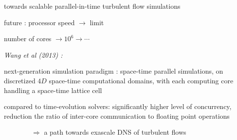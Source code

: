 \begin{frame}{
towards scalable parallel-in-time turbulent flow simulations
}
\begin{block}{future :}%
processor speed $\to$ limit

\medskip

number of cores $\to 10^6 \to \cdots$

\medskip
\end{block}

\emph{Wang et al (2013)
    :} %

next-generation simulation paradigm : space-time parallel
simulations, on discretized $4D$ space-time
computational domains, with each computing core handling a space-time lattice cell

\bigskip

compared to time-evolution solvers:
significantly higher level of concurrency, reduction the ratio of
inter-core communication to floating point operations

\bigskip

$\qquad\qquad\Rightarrow$ a path towards exascale DNS of turbulent flows
\end{frame}

